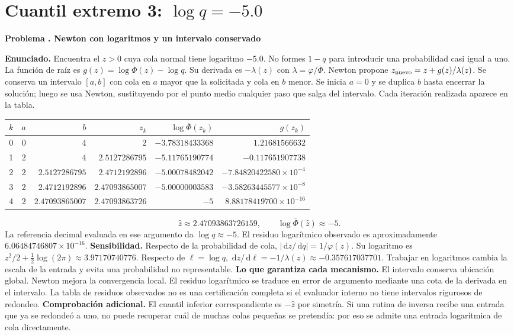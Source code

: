 \documentclass[11pt,a4paper]{article}
\newcommand{\dd}{\,\mathrm d}
\theoremstyle{definition}
\newcounter{problema}
\newenvironment{resuelto}[1]{\refstepcounter{problema}\par\medskip\Needspace{6\baselineskip}\textbf{Problema \theproblema. #1}\par}{\par\medskip}
\newcommand{\SF}{\overline\Phi}
\begin{document}
\section{\texorpdfstring{Cuantil extremo 3: $\log q=-5.0$}{Cuantil extremo 3: log q=-5.0}}
\begin{resuelto}{Newton con logaritmos y un intervalo conservado}
\textbf{Enunciado.} Encuentra el $z>0$ cuya cola normal tiene logaritmo $-5.0$. No formes $1-q$ para introducir una probabilidad casi igual a uno.
La función de raíz es $g(z)=\log\SF(z)-\log q$. Su derivada es $-\lambda(z)$ con $\lambda=\varphi/\SF$. Newton propone $z_{\rm nuevo}=z+g(z)/\lambda(z)$. Se conserva un intervalo $[a,b]$ con cola en $a$ mayor que la solicitada y cola en $b$ menor.
Se inicia $a=0$ y se duplica $b$ hasta encerrar la solución; luego se usa Newton, sustituyendo por el punto medio cualquier paso que salga del intervalo. Cada iteración realizada aparece en la tabla.

\begin{center}\small\begin{tabular}{rrrrrr}
\toprule
$k$&$a$&$b$&$z_k$&$\log\SF(z_k)$&$g(z_k)$\\
\midrule
0&$0$&$4$&$2$&$-3.78318433368$&$1.21681566632$\\
1&$2$&$4$&$2.5127286795$&$-5.11765190774$&$-0.117651907738$\\
2&$2$&$2.5127286795$&$2.4712192896$&$-5.00078482042$&$-7.84820422580\times10^{-4}$\\
3&$2$&$2.4712192896$&$2.47093865007$&$-5.00000003583$&$-3.58263445577\times10^{-8}$\\
4&$2$&$2.47093865007$&$2.47093863726$&$-5$&$8.88178419700\times10^{-16}$\\
\bottomrule\end{tabular}\end{center}
\[
\widehat z\approx2.47093863726159,\qquad \log\SF(\widehat z)\approx-5.
\]
La referencia decimal evaluada en ese argumento da $\log q\approx-5$. El residuo logarítmico observado es aproximadamente $6.06484746807\times10^{-16}$.
\textbf{Sensibilidad.} Respecto de la probabilidad de cola, $|\dd z/\dd q|=1/\varphi(z)$. Su logaritmo es $z^2/2+\tfrac12\log(2\pi)\approx3.97170740776$. Respecto de $\ell=\log q$, $\dd z/\dd\ell=-1/\lambda(z)\approx-0.357617037701$. Trabajar en logaritmos cambia la escala de la entrada y evita una probabilidad no representable.
\textbf{Lo que garantiza cada mecanismo.} El intervalo conserva ubicación global. Newton mejora la convergencia local. El residuo logarítmico se traduce en error de argumento mediante una cota de la derivada en el intervalo. La tabla de residuos observados no es una certificación completa si el evaluador interno no tiene intervalos rigurosos de redondeo.
\textbf{Comprobación adicional.} El cuantil inferior correspondiente es $-\widehat z$ por simetría. Si una rutina de inversa recibe una entrada que ya se redondeó a uno, no puede recuperar cuál de muchas colas pequeñas se pretendía: por eso se admite una entrada logarítmica de cola directamente.
\end{resuelto}
\end{document}
